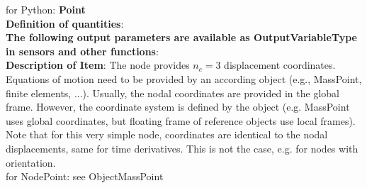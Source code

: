  for Python: {\bf Point}
 \vspace{6pt}\\{\bf Definition of quantities}:\\
\finishTable
{\bf The following output parameters are available as OutputVariableType in sensors and other functions}:\\ 
\finishTable
{\bf Description of Item}:
 \noindent
    The node provides $n_c=3$ displacement coordinates. Equations of motion need to be provided by an according object (e.g., MassPoint, finite elements, ...).
    Usually, the nodal coordinates are provided in the global frame. However, the coordinate system is defined by the object (e.g. MassPoint uses global coordinates, but floating frame of reference objects use local frames).
    Note that for this very simple node, coordinates are identical to the nodal displacements, same for time derivatives. This is not the case, e.g. for nodes with orientation. \vspace{6pt}\\
     for NodePoint: see ObjectMassPoint
\newpage

